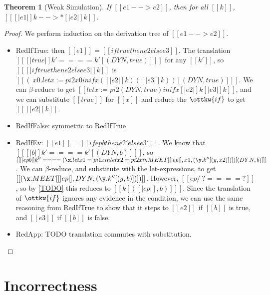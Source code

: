 \documentclass[11pt]{article}
\newtheorem{theorem}{Theorem}[section]
\begin{document}
\begin{theorem}[Weak Simulation] 

    If $[[e1 --> e2]]$, then for all $[[k]]$, $[[ [|e1|]k -->* [|e2|]k  ]]$.

\end{theorem}
\begin{proof}
    We perform induction on the derivation tree of $[[e1 --> e2]]$.

    \begin{itemize}
        \item 
        RedIfTrue: then $[[e1]]=[[if true then e2 else e3]]$. 
        The translation $[[ [|true|]k' ==== k' [(DYN, true)]  ]]$ for any $[[k']]$,
        so $[[ [|if true then e2 else e3|]k ]]$ is
        $[[(\ x0 . let x := pi2 x0 in if x ([|e2|]k) ([|e3|]k) ) [(DYN, true)]  ]]$.
        We can $\beta$-reduce to get $[[let x := pi2 (DYN, true) in if x [|e2|]k [|e3|]k ]]$,
        and we can substitute $[[true]]$ for $[[x]]$ and reduce the $\ottkw{if}$ to get $[[ [|e2|]k ]]$.
        
        \item RedIfFalse: symmetric to RedIfTrue
        
        \item RedIfEv: $[[e1]]=[[if ep b then e2' else e3']]$.
        We know that $[[ [| b|]k' ==== k' [(DYN, b)] ]]$,
        so $[[ [| ep b |]k'' ==== (\x. let x1 = pi1 x in let x2 = pi2 x in MEET[ [|ep|], x1, (\y.k''[(y,x2)]) ] )[(DYN,b)] ]]$.
        We can $\beta$-reduce, and substitute with the let-expressions, to get
        $[[(\x.  MEET[ [|ep|], DYN, (\y.k''[(y,b)]) ] )]]$.
        However, $[[ep /\ ? ==== ?]]$, so by \autoref{TODO} this reduces to $[[k [([|ep|], b)] ]]$. 
        Since the translation of $\ottkw{if}$ ignores any evidence in the condition,
        we can use the same reasoning from RedIfTrue to show that it steps to $[[e2]]$ if $[[b]]$ is true, and $[[e3]]$ if $[[b]]$ is false.
         
        \item RedApp: TODO translation commutes with substitution.
    \end{itemize}
\end{proof}
 
\section{Incorrectness}
\end{document}
